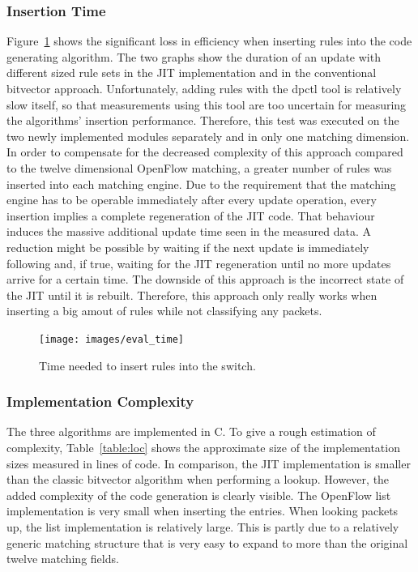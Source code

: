 \documentclass[a4paper,
		12pt,
		parskip=full,
		titlepage
		]{scrartcl}
\begin{document}
\subsubsection{Insertion Time}
\label{sec:eval-ins}
Figure~\ref{fig:eval-times} shows the significant loss in efficiency when inserting rules into the code generating algorithm.
The two graphs show the duration of an update with different sized rule sets in the 
JIT implementation and in the conventional bitvector approach.
Unfortunately, adding rules with the \textsf{dpctl} tool is relatively slow itself, so that measurements using this tool
are too uncertain for measuring the algorithms' insertion performance.
Therefore, this test was executed on the two newly implemented modules separately and in only one matching dimension.
In order to compensate for the decreased complexity of this approach compared to the twelve dimensional OpenFlow matching,
a greater number of rules was inserted into each matching engine.
Due to the requirement that the matching engine has to be operable 
immediately after every update operation, every insertion implies a complete regeneration of the JIT code.
That behaviour induces the massive additional update time seen in the measured data.
A reduction might be possible by waiting if the next update is immediately following
and, if true, waiting for the JIT regeneration until no more updates arrive for a certain time.
The downside of this approach is the incorrect state of the JIT until it is rebuilt.
Therefore, this approach only really works when inserting a big amout of rules while not classifying any packets.

\begin{figure}
\centering
\texttt{[image: images/eval\_time]}
\caption{Time needed to insert rules into the switch.}
\label{fig:eval-times}
\end{figure}

\subsubsection{Implementation Complexity}
The three algorithms are implemented in C.
To give a rough estimation of complexity, Table~\ref{table:loc} shows the 
approximate size of the implementation sizes measured in lines of code.
In comparison, the JIT implementation is smaller than the classic bitvector algorithm when performing a lookup.
However, the added complexity of the code generation is clearly visible.
The OpenFlow list implementation is very small when inserting the entries.
When looking packets up, the list implementation is relatively large.
This is partly due to a relatively generic matching structure that is very 
easy to expand to more than the original twelve matching fields.
\end{document}
